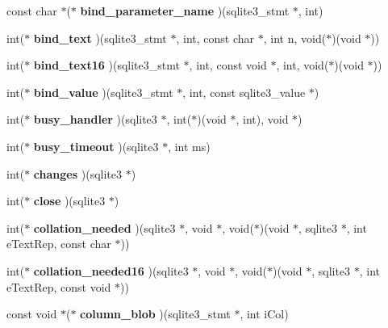 \begin{CompactItemize}
\item 
const char $\ast$($\ast$ \textbf{bind\_\-parameter\_\-name} )(sqlite3\_\-stmt $\ast$, int)\label{structsqlite3__api__routines_8c801db3685ffe33f19dbfed925aef3b}

\item 
int($\ast$ \textbf{bind\_\-text} )(sqlite3\_\-stmt $\ast$, int, const char $\ast$, int n, void($\ast$)(void $\ast$))\label{structsqlite3__api__routines_9475a194b191eb7566128f4d9f61d759}

\item 
int($\ast$ \textbf{bind\_\-text16} )(sqlite3\_\-stmt $\ast$, int, const void $\ast$, int, void($\ast$)(void $\ast$))\label{structsqlite3__api__routines_1864dde550ef9c69bf68d36f11633159}

\item 
int($\ast$ \textbf{bind\_\-value} )(sqlite3\_\-stmt $\ast$, int, const sqlite3\_\-value $\ast$)\label{structsqlite3__api__routines_cecedb9c3a26b1a2cd6df6bd73054e58}

\item 
int($\ast$ \textbf{busy\_\-handler} )(sqlite3 $\ast$, int($\ast$)(void $\ast$, int), void $\ast$)\label{structsqlite3__api__routines_07863280cc4db06232073af2500e16dc}

\item 
int($\ast$ \textbf{busy\_\-timeout} )(sqlite3 $\ast$, int ms)\label{structsqlite3__api__routines_4a77eede68e8279d2429ad52ff7c4926}

\item 
int($\ast$ \textbf{changes} )(sqlite3 $\ast$)\label{structsqlite3__api__routines_93870c0f7d19862394b0a8f5a391980f}

\item 
int($\ast$ \textbf{close} )(sqlite3 $\ast$)\label{structsqlite3__api__routines_1f45b3481032b930398184dc31d805e9}

\item 
int($\ast$ \textbf{collation\_\-needed} )(sqlite3 $\ast$, void $\ast$, void($\ast$)(void $\ast$, sqlite3 $\ast$, int eTextRep, const char $\ast$))\label{structsqlite3__api__routines_ac7c05d742d1a2d86660c7e2d301cd9d}

\item 
int($\ast$ \textbf{collation\_\-needed16} )(sqlite3 $\ast$, void $\ast$, void($\ast$)(void $\ast$, sqlite3 $\ast$, int eTextRep, const void $\ast$))\label{structsqlite3__api__routines_9bf97924e10fe4594149002ce4eff816}

\item 
const void $\ast$($\ast$ \textbf{column\_\-blob} )(sqlite3\_\-stmt $\ast$, int iCol)\label{structsqlite3__api__routines_e65af8ed71bc847bc84634a7c3bc1848}


\end{CompactItemize}
